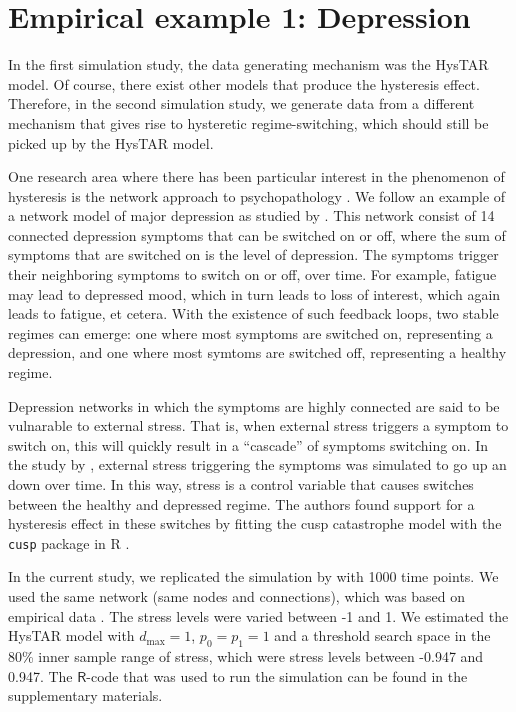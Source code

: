 \documentclass{article}
\begin{document}
\section{Empirical example 1: Depression} 
\label{sec:empirical_example_1}
In the first simulation study, the data generating mechanism was the HysTAR model. 
Of course, there exist other models that produce the hysteresis effect.
Therefore, in the second simulation study, we generate data from a different mechanism that gives rise to hysteretic regime-switching, which should still be picked up by the HysTAR model.

One research area where there has been particular interest in the phenomenon of hysteresis is the network approach to psychopathology \citep{borsboom_psychometric_2008}.
We follow an example of a network model of major depression as studied by \citet{cramer_major_2016}.
This network consist of 14 connected depression symptoms that can be switched on or off, where the sum of symptoms that are switched on is the level of depression.
The symptoms trigger their neighboring symptoms to switch on or off, over time. For example, fatigue may lead to depressed mood, which in turn leads to loss of interest, which again leads to fatigue, et cetera.
With the existence of such feedback loops, two stable regimes can emerge: one where most symptoms are switched on, representing a depression, and one where most symtoms are switched off, representing a healthy regime.

Depression networks in which the symptoms are highly connected are said to be vulnarable to external stress.
That is, when external stress triggers a symptom to switch on, this will  quickly result in a ``cascade'' of symptoms switching on.
In the study by \citet{cramer_major_2016}, external stress triggering the symptoms was simulated to go up an down over time.
In this way, stress is a control variable that causes switches between the healthy and depressed regime.
The authors found support for a hysteresis effect in these switches by fitting the cusp catastrophe model with the \texttt{cusp} package in \textsf{R} \citep{R, R_cusp}.

In the current study, we replicated the simulation by \citet{cramer_major_2016} with 1000 time points. 
We used the same network (same nodes and connections), which was based on empirical data \citep{network_data}. 
The stress levels were varied between -1 and 1. 
We estimated the HysTAR model with $d_{\max} = 1$, $p_0 = p_1 = 1$  and a threshold search space in the 80\% inner sample range of stress, which were stress levels between -0.947 and 0.947.
The $\mathsf{R}$-code that was used to run the simulation can be found in the supplementary materials.
\end{document}

